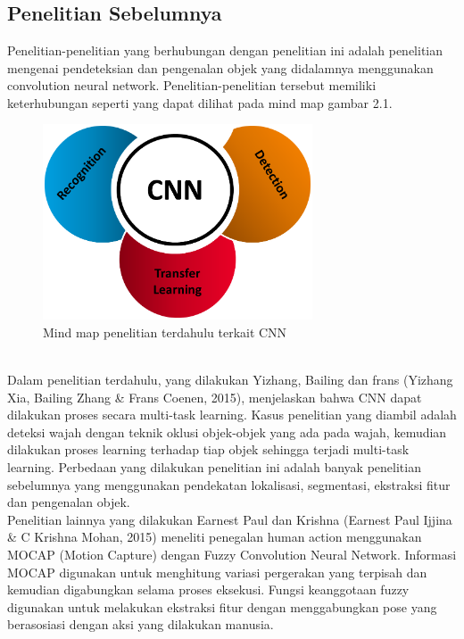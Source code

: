 \chapter{\babDua}
\section{Penelitian Sebelumnya}
Penelitian-penelitian yang berhubungan dengan penelitian ini adalah penelitian mengenai pendeteksian dan pengenalan objek yang didalamnya menggunakan convolution neural network. Penelitian-penelitian tersebut memiliki keterhubungan seperti yang dapat dilihat pada mind map gambar 2.1.\\
\begin{figure}[htp]
	\centering
	\includegraphics[width=8cm]{pics/mind_map}
	\caption{Mind map penelitian terdahulu terkait CNN}
	\label{fig:mind_map}
\end{figure}\\
Dalam penelitian terdahulu, yang dilakukan Yizhang, Bailing dan frans (Yizhang Xia, Bailing Zhang \& Frans Coenen, 2015), menjelaskan bahwa CNN dapat dilakukan proses secara multi-task learning. Kasus penelitian yang diambil adalah deteksi wajah dengan teknik oklusi objek-objek yang ada pada wajah, kemudian dilakukan proses learning terhadap tiap objek sehingga terjadi multi-task learning. Perbedaan yang dilakukan penelitian ini adalah banyak penelitian sebelumnya yang menggunakan pendekatan lokalisasi, segmentasi, ekstraksi fitur dan pengenalan objek. \\
Penelitian lainnya yang dilakukan Earnest Paul dan Krishna (Earnest Paul Ijjina \& C Krishna Mohan, 2015) meneliti penegalan human action menggunakan MOCAP (Motion Capture) dengan Fuzzy Convolution Neural Network. Informasi MOCAP digunakan untuk menghitung variasi pergerakan yang terpisah dan kemudian digabungkan selama proses eksekusi. Fungsi keanggotaan fuzzy digunakan untuk melakukan ekstraksi fitur dengan menggabungkan pose yang berasosiasi dengan aksi yang dilakukan manusia.\\
